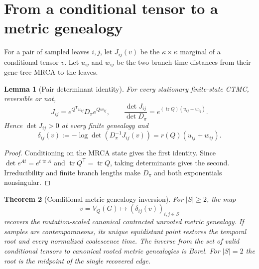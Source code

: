 \documentclass[11pt]{article}
\newtheorem{theorem}{Theorem}[section]
\newtheorem{lemma}[theorem]{Lemma}
\newcommand{\tr}{\operatorname{tr}}
\begin{document}
\section{From a conditional tensor to a metric genealogy}
\label{sec:determinant}

For a pair of sampled leaves $i,j$, let $J_{ij}(v)$ be the $\kappa\times\kappa$ marginal of a conditional tensor $v$.  Let $u_{ij}$ and $w_{ij}$ be the two branch-time distances from their gene-tree MRCA to the leaves.

\begin{lemma}[Pair determinant identity]
\label{lem:determinant}
For every stationary finite-state CTMC, reversible or not,
\begin{equation}
J_{ij}=e^{Q^{\mathsf T}u_{ij}}D_\pi e^{Qw_{ij}},
\qquad
\frac{\det J_{ij}}{\det D_\pi}=e^{(\tr Q)(u_{ij}+w_{ij})}.
\label{eq:pair-det}
\end{equation}
Hence $\det J_{ij}>0$ at every finite genealogy and
\begin{equation}
\delta_{ij}(v):=-\log\det(D_\pi^{-1}J_{ij}(v))
=r(Q)(u_{ij}+w_{ij}).
\label{eq:delta}
\end{equation}
\end{lemma}

\begin{proof}
Conditioning on the MRCA state gives the first identity.  Since $\det e^{At}=e^{t\tr A}$ and $\tr Q^{\mathsf T}=\tr Q$, taking determinants gives the second.  Irreducibility and finite branch lengths make $D_\pi$ and both exponentials nonsingular.
\end{proof}

\begin{theorem}[Conditional metric-genealogy inversion]
\label{thm:conditional-inversion}
For $|S|\ge2$, the map
\[
v=V_Q(G)\longmapsto (\delta_{ij}(v))_{i,j\in S}
\]
recovers the mutation-scaled canonical contracted unrooted metric genealogy.  If samples are contemporaneous, its unique equidistant point restores the temporal root and every normalized coalescence time.  The inverse from the set of valid conditional tensors to canonical rooted metric genealogies is Borel.  For $|S|=2$ the root is the midpoint of the single recovered edge.
\end{theorem}
\end{document}
